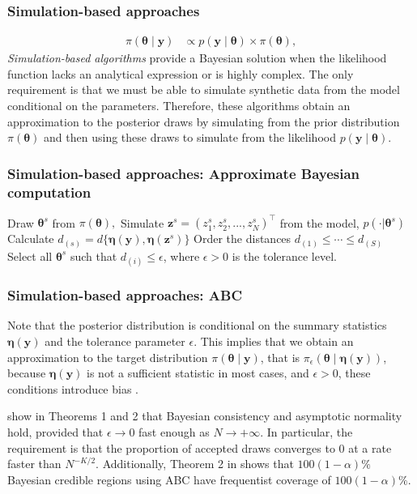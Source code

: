 \documentclass[12pt, compress]{beamer}
\begin{document}
\begin{frame}
	\frametitle{Simulation-based approaches}
\begin{align*}
	\pi(\boldsymbol{\theta} \mid \mathbf{y}) & \propto p(\mathbf{y} \mid \boldsymbol{\theta}) \times \pi(\boldsymbol{\theta}),
\end{align*} 
\textit{Simulation-based algorithms} provide a Bayesian solution when the likelihood function lacks an analytical expression or is highly complex. The only requirement is that we must be able to simulate synthetic data from the model conditional on the parameters. Therefore, these algorithms obtain an approximation to the posterior draws by simulating from the prior distribution $\pi(\boldsymbol{\theta})$ and then using these draws to simulate from the likelihood $p(\mathbf{y} \mid \boldsymbol{\theta})$.
\end{frame}

\begin{frame}
	\frametitle{Simulation-based approaches: Approximate Bayesian computation}
\begin{algorithm}[H]
	\caption{Accept/reject ABC}\label{ABC0}
	\begin{algorithmic}[1]
		\State Draw ${\boldsymbol {\theta} }^{s}$ from $\pi({ \boldsymbol{\theta} }),$
		\State Simulate ${\boldsymbol z}^{s}=(z_{1}^{s},z_{2}^{s},...,z_{N}^{s})^{\top}$ from the model, $p(\cdot|{\boldsymbol{\theta} }^{s})$
		\State Calculate
		$d_{(s)}=d\{{\boldsymbol\eta }({\boldsymbol y}),{\boldsymbol \eta }({\boldsymbol z}^{s})\}$
		\EndFor
		\State Order the distances $d_{(1)}\leq\cdots\leq d_{(S)}$
		\State Select all $\boldsymbol{\theta}^s$ such that $d_{(i)}\leq \epsilon$, where $\epsilon>0$ is the tolerance level. 
	\end{algorithmic}
\end{algorithm}
\end{frame}

\begin{frame}
	\frametitle{Simulation-based approaches: ABC}
Note that the posterior distribution is conditional on the summary statistics \( \boldsymbol{\eta}(\boldsymbol{y}) \) and the tolerance parameter \( \epsilon \). This implies that we obtain an approximation to the target distribution \( \pi(\boldsymbol{\theta} \mid \boldsymbol{y}) \), that is \( \pi_{\epsilon}(\boldsymbol{\theta} \mid \boldsymbol{\eta}(\boldsymbol{y})) \), because \( \boldsymbol{\eta}(\boldsymbol{y}) \) is not a sufficient statistic in most cases, and \( \epsilon > 0 \), these conditions introduce bias \citep{blum2010approximate}.

\cite{frazier2018asymptotic} show in Theorems 1 and 2 that Bayesian consistency and asymptotic normality hold, provided that \( \epsilon \to 0 \) fast enough as \( N \to +\infty \). In particular, the requirement is that the proportion of accepted draws converges to 0 at a rate faster than \( N^{-K / 2} \). Additionally, Theorem 2 in \cite{frazier2018asymptotic} shows that \( 100(1 -\alpha)\% \) Bayesian credible regions using ABC have frequentist coverage of \( 100(1 -\alpha)\% \).
\end{frame}
\end{document}
